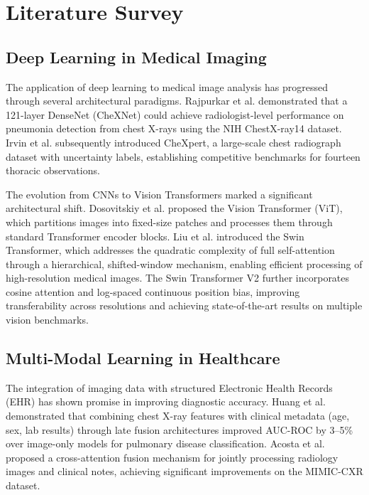 \documentclass[12pt,a4paper]{report}
\begin{document}
\chapter{Literature Survey}

\section{Deep Learning in Medical Imaging}

The application of deep learning to medical image analysis has progressed through several architectural paradigms. Rajpurkar et al. \cite{rajpurkar2017chexnet} demonstrated that a 121-layer DenseNet (CheXNet) could achieve radiologist-level performance on pneumonia detection from chest X-rays using the NIH ChestX-ray14 dataset. Irvin et al. \cite{irvin2019chexpert} subsequently introduced CheXpert, a large-scale chest radiograph dataset with uncertainty labels, establishing competitive benchmarks for fourteen thoracic observations.

The evolution from CNNs to Vision Transformers marked a significant architectural shift. Dosovitskiy et al. \cite{dosovitskiy2020image} proposed the Vision Transformer (ViT), which partitions images into fixed-size patches and processes them through standard Transformer encoder blocks. Liu et al. \cite{liu2021swin} introduced the Swin Transformer, which addresses the quadratic complexity of full self-attention through a hierarchical, shifted-window mechanism, enabling efficient processing of high-resolution medical images. The Swin Transformer V2 \cite{liu2022swinv2} further incorporates cosine attention and log-spaced continuous position bias, improving transferability across resolutions and achieving state-of-the-art results on multiple vision benchmarks.

\section{Multi-Modal Learning in Healthcare}

The integration of imaging data with structured Electronic Health Records (EHR) has shown promise in improving diagnostic accuracy. Huang et al. \cite{huang2020multimodal} demonstrated that combining chest X-ray features with clinical metadata (age, sex, lab results) through late fusion architectures improved AUC-ROC by 3--5\% over image-only models for pulmonary disease classification. Acosta et al. \cite{acosta2022multimodal} proposed a cross-attention fusion mechanism for jointly processing radiology images and clinical notes, achieving significant improvements on the MIMIC-CXR dataset.
\end{document}
